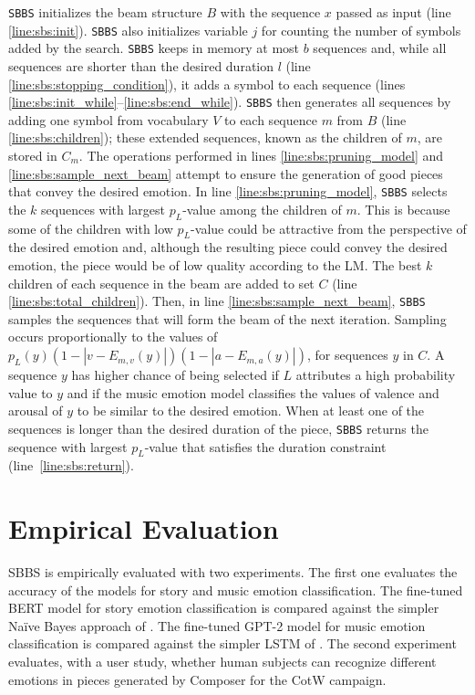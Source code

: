 \texttt{SBBS} initializes the beam structure $B$ with the sequence $x$ passed as input (line \ref{line:sbs:init}).
\texttt{SBBS} also initializes variable $j$ for counting the number of symbols added by the search. \texttt{SBBS} keeps in memory at most $b$ sequences and, while all sequences are shorter than the desired duration $l$ (line \ref{line:sbs:stopping_condition}), it adds a symbol to each sequence (lines \ref{line:sbs:init_while}--\ref{line:sbs:end_while}). \texttt{SBBS} then generates all sequences by adding one symbol from vocabulary $V$ to each sequence $m$ from $B$ (line \ref{line:sbs:children}); these extended sequences, known as the children of $m$, are stored in $C_m$. The operations performed in lines \ref{line:sbs:pruning_model} and \ref{line:sbs:sample_next_beam} attempt to ensure the generation of good pieces that convey the desired emotion. In line \ref{line:sbs:pruning_model}, \texttt{SBBS} selects the $k$ sequences with largest $p_L$-value among the children of $m$. This is because some of the children with low $p_L$-value could be attractive from the perspective of the desired emotion and, although the resulting piece could convey the desired emotion, the piece would be of low quality according to the LM. The best $k$ children of each sequence in the beam are added to set $C$ (line \ref{line:sbs:total_children}). Then, in line \ref{line:sbs:sample_next_beam}, \texttt{SBBS} samples the sequences that will form the beam of the next iteration. Sampling occurs proportionally to the values of $p_L(y) (1 - |v - E_{m,v}(y)|) (1 - |a - E_{m,a}(y)|)$, for sequences $y$ in $C$. A sequence $y$ has higher chance of being selected if $L$ attributes a high probability value to $y$ and if the music emotion model classifies the values of valence and arousal of $y$ to be similar to the desired emotion. When at least one of the sequences is longer than the desired duration of the piece, \texttt{SBBS} returns the sequence with largest $p_L$-value that satisfies the duration constraint (line~\ref{line:sbs:return}).

\section{Empirical Evaluation}

SBBS is empirically evaluated with two experiments. The first one evaluates the accuracy of the models for story and music emotion classification. The fine-tuned BERT model for story emotion classification is compared against the simpler Na\"ive Bayes approach of \citet{padovani2017}. The fine-tuned GPT-2 model for music emotion classification is compared against the simpler LSTM of \cite{ferreira_2019}. The second experiment evaluates, with a user study, whether human subjects can recognize different emotions in pieces generated by Composer for the CotW campaign.

